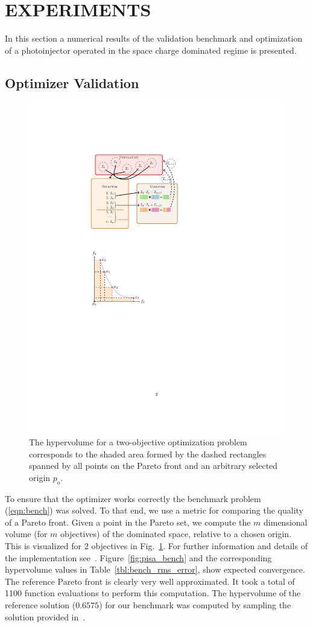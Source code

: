 \section{EXPERIMENTS} \label{sec:experiments}

In this section a numerical results of the validation benchmark and
  optimization of a photoinjector operated in the space charge dominated regime is presented.

\subsection{Optimizer Validation}

\begin{figure}
    \centering
      \includegraphics[width=0.4\linewidth]{figures/hypervolume}
  \caption{The hypervolume for a two-objective optimization problem
  corresponds to the shaded area formed by the dashed rectangles spanned by
  all points on the Pareto front and an arbitrary selected origin $p_o$.}
  \label{fig:hypervolume}
\end{figure}

To ensure that the optimizer works correctly the benchmark
  problem (\ref{eqn:bench}) was solved.
To that end, we use a metric for comparing the quality of a Pareto
  front.
Given a point in the Pareto set, we compute the $m$ dimensional volume (for
  $m$ objectives) of the dominated space, relative to a chosen origin.
This is visualized for $2$ objectives in Fig.~\ref{fig:hypervolume}.
For further information and details of the implementation see~\cite{whbb:12}.
Figure~\ref{fig:pisa_bench} and the corresponding hypervolume values in
  Table~\ref{tbl:bench_rms_error}, show expected convergence.
The reference Pareto front is clearly very well approximated.
It took a total of 1100 function evaluations to perform this computation.
The hypervolume of the reference solution ($0.6575$) for our benchmark was
  computed by sampling the solution provided in~\cite{hbwh:05}.

